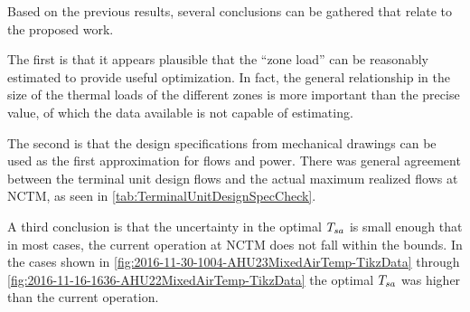 Based on the previous results, several conclusions can be gathered that
relate to the proposed work.

The first is that it appears plausible that the ``zone load'' can be
reasonably estimated to provide useful optimization.  In fact, the
general relationship in the size of the thermal loads of the different
zones is more important than the precise value, of which the data
available is not capable of estimating. 

The second is that the design specifications from mechanical drawings
can be used as the first approximation for flows and power.  There was
general agreement between the terminal unit design flows and the actual
maximum realized flows at NCTM, as seen in \tableref{}
\ref{tab:TerminalUnitDesignSpecCheck}. 

A third conclusion is that the uncertainty in the optimal \(T_{sa}\) is
small enough that in most cases, the current operation at NCTM does not
fall within the bounds.  In the cases shown in \figref{}
\ref{fig:2016-11-30-1004-AHU23MixedAirTemp-TikzData} through \figref{}
\ref{fig:2016-11-16-1636-AHU22MixedAirTemp-TikzData} the optimal
\(T_{sa}\) was higher than the current operation. 
